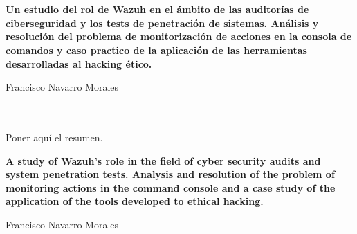 \chapter*{}






\cleardoublepage
\thispagestyle{empty}

\begin{center}
{\large\bfseries Un estudio del rol de Wazuh en el ámbito de las auditorías de ciberseguridad y los tests de penetración de sistemas. Análisis y resolución del problema de monitorización de acciones en la consola de comandos y caso practico de la aplicación de las herramientas desarrolladas al hacking ético.\\
}
\end{center}
\begin{center}
Francisco Navarro Morales\\
\end{center}

\\

\vspace{0.7cm}
\\

Poner aquí el resumen.
\cleardoublepage


\thispagestyle{empty}


\begin{center}
{\large\bfseries A study of Wazuh's role in the field of cyber security audits and system penetration tests. Analysis and resolution of the problem of monitoring actions in the command console and a case study of the application of the tools developed to ethical hacking.}\\
\end{center}
\begin{center}
Francisco Navarro Morales\\
\end{center}

\\

\vspace{0.7cm}
\\

